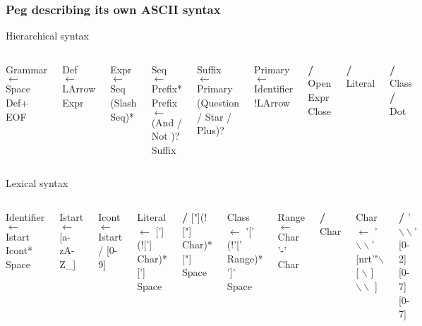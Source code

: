 \begin{frame}
	\frametitle{Peg describing its own ASCII syntax}
	\begin{minipage}{\textwidth}
		\begin{flushleft}Hierarchical syntax\end{flushleft}
\begin{columns}
		
		\tiny
	
		
		Grammar $\leftarrow$ Space Def+ EOF
		
		Def $\leftarrow$ LArrow Expr
		
		Expr  $\leftarrow$ Seq (Slash Seq)*
		
		Seq $\leftarrow$ Prefix*
		\tiny
		Prefix $\leftarrow$ (And / Not )? Suffix
		
		Suffix $\leftarrow$ Primary (Question / Star / Plus)?
		
		Primary $\leftarrow$ Identifier !LArrow  
												
												\textbf{/} Open  Expr Close
												
												\textbf{/}  Literal
												
												\textbf{/} Class
												 \textbf{/} Dot
		\end{columns}
		\end{minipage}
		\vfill
		\begin{minipage}{\textwidth}
			\begin{flushleft}Lexical syntax\end{flushleft}
			\tiny
		\begin{columns}
	
		Identifier $\leftarrow$ Istart Icont* Space
		
		Istart $\leftarrow$ [a-zA-Z\_]
		
		Icont $\leftarrow$ Istart / [0-9]
		
		Literal  $\leftarrow$ ['](!['] Char)* ['] Space
		
		\textbf{/} ["](!["] Char)* ["] Space
		
		Class $\leftarrow$ '[' (!'[' Range)* ']' Space
		
		Range $\leftarrow$ Char '-' Char 
		
		\textbf{/} Char
		
		Char $\leftarrow$ ' $\backslash\backslash$' [nrt'"$\backslash$ [ $\backslash$ ] $\backslash\backslash$ ]
		
		\textbf{/} '$\backslash\backslash$' [0-2][0-7][0-7] 
		

\end{columns}
\end{minipage}
\end{frame}
